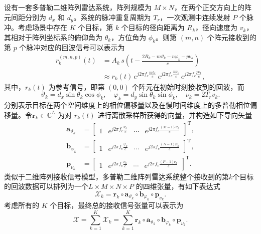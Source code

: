 设有一套多普勒二维阵列雷达系统，阵列规模为 \(M \times N\)，在两个正交方向上的阵元间距分别为 \(d_x\) 和 \(d_y\)。系统的脉冲重复周期为 \(T_r\)，一次观测中连续发射 \(P\) 个脉冲。考虑场景中存在 \(K\) 个目标，第 \(k\) 个目标的径向距离为 \(R_k\)，径向速度为 \(v_k\)，其相对于阵列坐标系的俯仰角为 \(\theta_k\)，方位角为 \(\phi_k\)。则第 \((m,n)\) 个阵元接收到的第 \(p\) 个脉冲对应的回波信号可以表示为
\[
    \begin{split}
        r^{(m,n,p)}_k(t)
         & = A_k\, s\left(t - \frac{2 R_k - m\vartheta_k - n\varphi_k - p\nu_k}{c}\right) \\
         & \approx r_k(t)\,
        e^{j 2 \pi f_c \tfrac{m \vartheta_k}{c}}\,
        e^{j 2 \pi f_c \tfrac{n \varphi_k}{c}}\,
        e^{j 2 \pi f_c \tfrac{p \nu_k}{c}},
    \end{split}
\]
其中，\(r_k(t)\) 为参考信号，即第 \((0,0)\) 个阵元在初始时刻接收到的回波，而
\[
    \vartheta_k = d_x \sin\theta_k \cos\phi_k,
    \quad
    \varphi_k = d_y \sin\theta_k \sin\phi_k,
    \quad
    \nu_k = 2 T_r v_k.
\]
分别表示目标在两个空间维度上的相位偏移量以及在慢时间维度上的多普勒相位偏移量。令\( \bm{r}_k \in \mathbb{C}^{L} \) 为对 \(r_k(t)\) 进行离散采样所获得的向量，并构造如下导向矢量
\[
    \begin{split}
        \bm{a}_{\vartheta_k} & = \begin{bmatrix}
                                     1 & e^{j 2 \pi f_c \frac{\vartheta_k}{c}} & \cdots & e^{j 2 \pi f_c \frac{(M-1) \vartheta_k}{c}}
                                 \end{bmatrix}^{\mathrm{T}}, \\
        \bm{b}_{\varphi_k}   & = \begin{bmatrix}
                                     1 & e^{j 2 \pi f_c \frac{\varphi_k}{c}} & \cdots & e^{j 2 \pi f_c \frac{(N-1) \varphi_k}{c}}
                                 \end{bmatrix}^{\mathrm{T}}, \\
        \bm{p}_{\nu_k}       & = \begin{bmatrix}
                                     1 & e^{j 2 \pi f_c \frac{\nu_k}{c}} & \cdots & e^{j 2 \pi f_c \frac{(P-1) \nu_k}{c}}
                                 \end{bmatrix}^{\mathrm{T}}.
    \end{split}
\]
类似于二维阵列接收信号模型，多普勒二维阵列雷达系统整个接收到的第\( k \)个目标的回波数据可以排列为一个\( L \times M \times N \times P \) 的四维张量，有如下表达式
\[
    \mathcal{X}_k = \bm{r}_k \circ \bm{a}_{\vartheta_k} \circ \bm{b}_{\varphi_k} \circ \bm{p}_{\nu_k}.
\]
考虑所有的 \(K\) 个目标，最终总的接收信号张量可以表示为
\[
    \mathcal{X} = \sum_{k=1}^{K} \mathcal{X}_k = \sum_{k=1}^{K} \bm{r}_k \circ \bm{a}_{\vartheta_k} \circ \bm{b}_{\varphi_k} \circ \bm{p}_{\nu_k}.
\]

